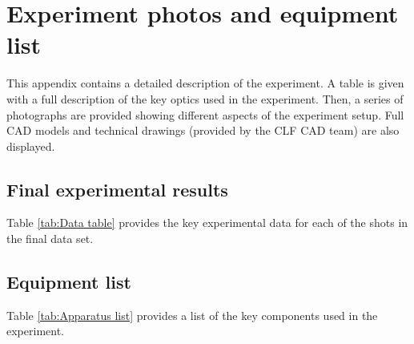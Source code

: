 

\chapter{\label{app:2-experimentphotos} Experiment photos and equipment list}

\minitoc

This appendix contains a detailed description of the experiment. A table is given with a full description of the key optics used in the experiment. Then, a series of photographs are provided showing different aspects of the experiment setup. Full CAD models and technical drawings (provided by the CLF CAD team) are also displayed.

\section{Final experimental results}

Table \ref{tab:Data table} provides the key experimental data for each of the shots in the final data set.


\section{Equipment list}
\label{sec:Equipment}

Table \ref{tab:Apparatus list} provides a list of the key components used in the experiment.

